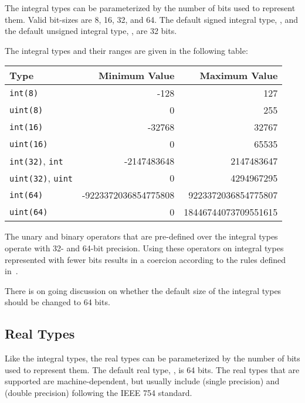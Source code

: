 The integral types can be parameterized by the number of bits used to
represent them.  Valid bit-sizes are 8, 16, 32, and 64.  
The default signed integral type, , and the
default unsigned integral type, , are 32 bits.

The integral types and their ranges are given in the following table:

\begin{center}
\begin{tabular}{|l|r|r|}
\hline
{\bf Type} & {\bf Minimum Value} & {\bf Maximum Value} \\
\hline
{\tt int(8)} & -128 & 127 \\
{\tt uint(8)} & 0 & 255 \\
{\tt int(16)} & -32768 & 32767 \\
{\tt uint(16)} & 0 & 65535 \\
{\tt int(32)}, {\tt int} & -2147483648 & 2147483647 \\
{\tt uint(32)}, {\tt uint} & 0 & 4294967295 \\
{\tt int(64)} & -9223372036854775808 & 9223372036854775807 \\
{\tt uint(64)} & 0 & 18446744073709551615 \\
\hline
\end{tabular}
\end{center}

The unary and binary operators that are pre-defined over the integral
types operate with 32- and 64-bit precision.  Using these operators on
integral types represented with fewer bits results in a coercion
according to the rules defined in~.

\begin{openissue}
There is on going discussion on whether the default size of the
integral types should be changed to 64 bits.
\end{openissue}


\subsection{Real Types}
\label{Real_Types}

Like the integral types, the real types can be parameterized by the
number of bits used to represent them.  The default real
type, , is 64 bits.  The real types that are supported are
machine-dependent, but usually include  (single
precision) and  (double precision) following the IEEE
754 standard.  

